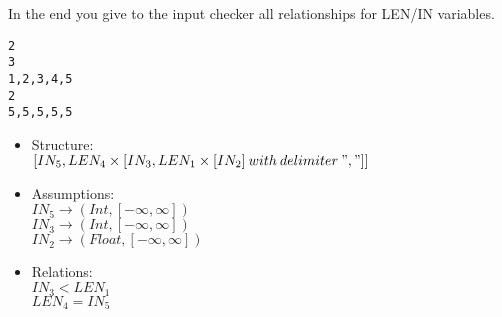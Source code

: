 \documentclass[11pt]{article}
\begin{document}
In the end you give to the input checker all relationships for LEN/IN variables.

\begin{lstlisting}[numbers=none]
2
3
1,2,3,4,5
2
5,5,5,5,5
\end{lstlisting}



\begin{itemize}
  \item Structure:\\
  $[IN_5, LEN_4 \times [IN_3, LEN_1 \times [IN_2]\:with\:delimiter\:","]]$
  \item Assumptions:\\
  $IN_5 \rightarrow (Int, [-\infty, \infty])$\\
  $IN_3 \rightarrow (Int, [-\infty, \infty])$\\
  $IN_2 \rightarrow (Float, [-\infty, \infty])$
  \item Relations:\\
  $IN_3 < LEN_1$\\
  $LEN_4 = IN_5$\\
\end{itemize}
\end{document}
